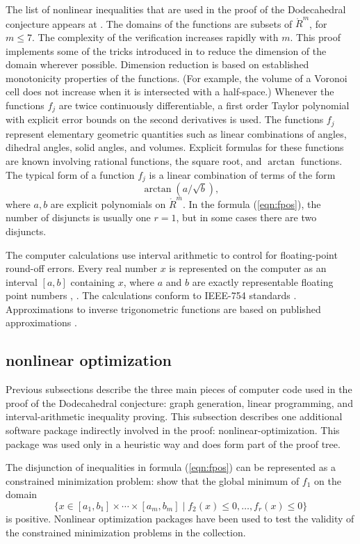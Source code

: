 \documentclass{article} %
\begin{document}
The list of nonlinear inequalities that are used in the
proof of the Dodecahedral conjecture appears at \cite{code}.
The domains of the functions are subsets of $\ring{R}^m$, for
$m\le 7$.  The complexity of the verification increases
rapidly with $m$.  This proof implements  some of the tricks introduced
in \cite{Hales:2006:DCG} to reduce the dimension of the domain wherever
possible.  Dimension reduction is based on established
monotonicity properties of the functions.  (For example, the
volume of a Voronoi cell does not increase when it is intersected
with a half-space.)  Whenever the functions $f_j$ are twice continuously
differentiable,  a first order Taylor polynomial with
explicit error bounds on the second derivatives is used. 
The functions $f_j$ represent elementary geometric quantities such
as linear combinations of angles, dihedral angles, solid angles,
and volumes.  Explicit formulas for these functions are known
involving rational functions, the square root, and $\arctan$ functions.
The typical form of a function $f_j$ is a linear combination of terms
of the form
    $$
    \arctan(a/\sqrt{b}),
    $$
where $a,b$ are explicit polynomials on $\ring{R}^m$.
In the 
formula (\ref{eqn:fpos}), the number of disjuncts is usually one
$r=1$, but in some cases there are two disjuncts.

The computer calculations use interval arithmetic to
control for floating-point round-off errors.  Every real number $x$
is represented on the computer as an interval $[a,b]$ containing $x$, where $a$ and $b$ are
exactly representable floating point numbers \cite{Interval}, \cite{Numerics}.
The calculations conform to IEEE-754 standards \cite{Float}.
Approximations to inverse trigonometric functions are based on 
published approximations \cite{Approx}.



\subsection{nonlinear optimization}

Previous subsections describe the three main pieces of computer
code used in the proof of the Dodecahedral conjecture: graph 
generation, linear programming, and interval-arithmetic inequality
proving.  This subsection describes one additional software
package indirectly involved in the proof: nonlinear-optimization.  
This package was used only in a heuristic way
and does form part of the proof tree.

The disjunction of inequalities in formula (\ref{eqn:fpos}) can
be represented as a constrained minimization problem: show that
the global minimum of $f_1$ on the domain
$$
\{x\in[a_1,b_1]\times\cdots\times[a_m,b_m] \mid  f_2(x)\le 0,\ldots,
  f_r(x)\le 0 \}
$$
is positive. Nonlinear optimization packages have been
used to test the validity of the constrained minimization
problems in the collection.
\end{document}
